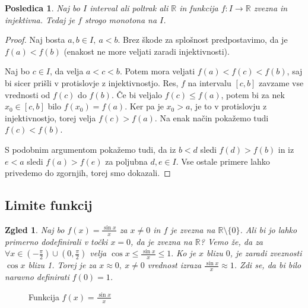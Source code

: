 \documentclass[10pt, a4paper]{article}
\newtheorem{posledica}[izr]{Posledica}
\newtheorem{zgled}[izr]{Zgled}
\newenvironment{noticeC}{%
  \tcolorbox[%
  notitle,
  empty,
  enhanced,  %
  breakable,
  coltext=black, 
  fontupper=\rmfamily,
  noparskip,
  sharp corners,
  boxrule=-1pt,  %
  frame hidden,
  left=7pt,  %
  right=7pt,
  top=5pt,
  bottom=5pt,
  before skip=2.5ex plus 2pt,
  after skip=2.5ex plus 2pt,
  overlay unbroken and last={%
  },
  ]}
{\endtcolorbox}
\newenvironment{dokaz}%
  {\begin{noticeC}\begin{proof}}%
  {\end{proof}\end{noticeC}}
\newcommand{\R}{\mathbb {R}}
\begin{document}
\begin{posledica}
    Naj bo $I$ interval ali poltrak ali $\R$ in funkcija $f: I \rightarrow \R$ zvezna in injektivna. Tedaj je $f$ strogo monotona na $I$.
\end{posledica}

\begin{dokaz}
    Naj bosta $a,b \in I,\ a<b$. Brez škode za splošnost predpostavimo, da je $f(a) < f(b)$ (enakost ne more veljati zaradi injektivnosti). 

        Naj bo $c \in I$, da velja $a < c < b$. Potem mora veljati $f(a) < f(c) < f(b)$, saj bi sicer prišli v protislovje z injektivnostjo. 
        Res, $f$ na intervalu $[c,b]$ zavzame vse vrednosti od $f(c)$ do $f(b)$. Če bi veljalo $f(c) \leq f(a)$, potem bi za nek $x_0 \in [c,b]$ bilo $f(x_0) = f(a)$. 
        Ker pa je $x_0 > a$, je to v protislovju z injektivnostjo, torej velja $f(c) > f(a)$.
        Na enak način pokažemo tudi $f(c) < f(b)$.
        
        S podobnim argumentom pokažemo tudi, da iz $b < d$ sledi $f(d) > f(b)$ in iz $e < a$ sledi $f(a) > f(e)$ za poljubna $d,e \in I$.
        Vse ostale primere lahko privedemo do zgornjih, torej smo dokazali.
\end{dokaz}

\subsection{Limite funkcij}

\begin{zgled}
    Naj bo $f(x) = \frac{\sin x}{x}$ za $x \neq 0$ in $f$ je zvezna na $\R \setminus \{0\}$. Ali bi jo lahko primerno dodefinirali v točki $x = 0$, da je zvezna na $\R$?
    Vemo že, da za $\forall x \in \left(-\frac{\pi}{2} \right) \cup \left(0, \frac{\pi}{2} \right)$ velja $\cos x \leq \frac{\sin x}{x} \leq 1.$ Ko je $x$ blizu $0$, je zaradi zveznosti $\cos x$ blizu 1. Torej je za $x \approx 0,\ x \neq 0$ vrednost izraza $\frac{\sin x}{x} \approx 1$.
    Zdi se, da bi bilo naravno definirati $f(0) = 1$.
\end{zgled}

\begin{figure}[hbt!]
    \centering
    \caption{Funkcija $f(x) = \frac{\sin{x}}{x}$}
\end{figure}
\end{document}
